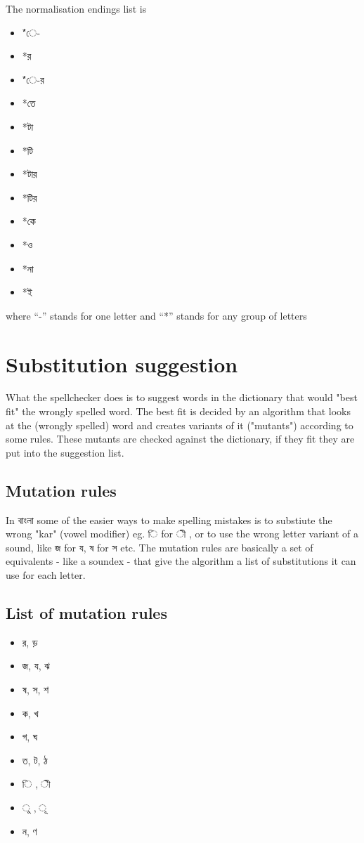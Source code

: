 \documentclass[11pt]{article}
\begin{document}
The normalisation endings list is
{\lbng 
\begin{itemize}
\item *ে-
\item *র
\item *ে-র
\item *তে
\item *টা
\item *টি
\item *টার
\item *টির
\item *কে
\item *ও
\item *না
\item *ই
\end{itemize}
}
where ``-'' stands for one letter and ``*'' stands for any group of letters

\section{Substitution suggestion}
What the spellchecker does is to suggest words in the dictionary that would "best fit" the wrongly spelled word. The best fit is decided by an algorithm that looks at the (wrongly spelled) word and creates variants of it ("mutants") according to some rules. These mutants are checked against the dictionary, if they fit they are put into the suggestion list.


\subsection{Mutation rules}
In {\bng বাংলা} some of the easier ways to make spelling mistakes is to substiute the wrong "kar" (vowel modifier) eg. {\bng ি} for {\bng ী} , or to use the wrong letter variant of a sound, like {\bng জ} for {\bng য},  {\bng ষ} for {\bng স} etc. 
The mutation rules are basically a set of equivalents - like a soundex - that give the algorithm a list of substitutions it can use for each letter.

\subsection{List of mutation rules}
{\lbng
\begin{itemize}
\item র, ড়
\item জ, য, ঝ
\item ষ, স, শ
\item ক, খ
\item গ, ঘ
\item ত, ট, ঠ
\item ি , ী
\item  ু , ূ
\item ন, ণ
\end{itemize}
}
\end{document}
